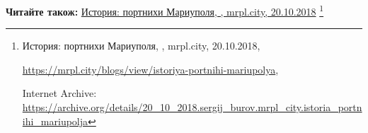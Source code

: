  
 
 
 
 

\def\pubIA{https://archive.org/details/20_10_2018.sergij_burov.mrpl_city.istoria_portnihi_mariupolja}
\def\pubTitle{История: портнихи Мариуполя}
\def\pubDate{20.10.2018}
\def\pubOrigin{https://mrpl.city/blogs/view/istoriya-portnihi-mariupolya}
\def\pubAuthor{\pubAuthorBurov}

\textbf{Читайте також:} \href{\pubIA}{%
\pubTitle, \pubAuthor, mrpl.city, \pubDate}%
\footnote{\pubTitle, \pubAuthor, mrpl.city, \pubDate, \par\url{\pubOrigin}, \par Internet Archive: \url{\pubIA}}
